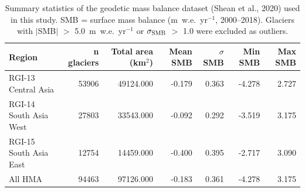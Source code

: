 \begin{table}[htbp]
\centering
\caption{Summary statistics of the geodetic mass balance dataset (Shean et al., 2020) used in this study. SMB = surface mass balance (m~w.e.~yr$^{-1}$, 2000--2018). Glaciers with $|$SMB$|$ $>$ 5.0~m~w.e.~yr$^{-1}$ or $\sigma_{\rm SMB}$ $>$ 1.0 were excluded as outliers.}
\label{tab:dataset_summary}
\begin{tabular}{lrrrrrr}
\hline
Region & n glaciers & Total area (km$^2$) & Mean SMB & $\sigma$ SMB & Min SMB & Max SMB \\
\hline
RGI-13 Central Asia & 53906 & 49124.000 & -0.179 & 0.363 & -4.278 & 2.727 \\
RGI-14 South Asia West & 27803 & 33543.000 & -0.092 & 0.292 & -3.519 & 3.175 \\
RGI-15 South Asia East & 12754 & 14459.000 & -0.400 & 0.395 & -2.717 & 3.090 \\
All HMA & 94463 & 97126.000 & -0.183 & 0.361 & -4.278 & 3.175 \\
\hline
\end{tabular}
\end{table}